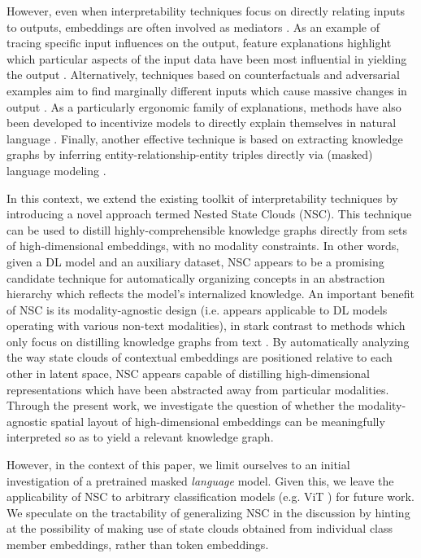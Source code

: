 However, even when interpretability techniques focus on directly relating inputs to outputs, embeddings are often involved as mediators \citep{danilevsky_survey_nodate}. As an example of tracing specific input influences on the output, feature explanations highlight which particular aspects of the input data have been most influential in yielding the output \citep{jain_attention_nodate}. Alternatively, techniques based on counterfactuals and adversarial examples aim to find marginally different inputs which cause massive changes in output \citep{madsen_post-hoc_2021}. As a particularly ergonomic family of explanations, methods have also been developed to incentivize models to directly explain themselves in natural language \citep{madsen_post-hoc_2021}. Finally, another effective technique is based on extracting knowledge graphs by inferring entity-relationship-entity triples directly via (masked) language modeling \citep{wang_language_2020}.

In this context, we extend the existing toolkit of interpretability techniques by introducing a novel approach termed Nested State Clouds (NSC). This technique can be used to distill highly-comprehensible knowledge graphs directly from sets of high-dimensional embeddings, with no modality constraints. In other words, given a DL model and an auxiliary dataset, NSC appears to be a promising candidate technique for automatically organizing concepts in an abstraction hierarchy which reflects the model's internalized knowledge. An important benefit of NSC is its modality-agnostic design (i.e. appears applicable to DL models operating with various non-text modalities), in stark contrast to methods which only focus on distilling knowledge graphs from text \citep{wang_language_2020}. By automatically analyzing the way state clouds of contextual embeddings are positioned relative to each other in latent space, NSC appears capable of distilling high-dimensional representations which have been abstracted away from particular modalities. Through the present work, we investigate the question of whether the modality-agnostic spatial layout of high-dimensional embeddings can be meaningfully interpreted so as to yield a relevant knowledge graph.

However, in the context of this paper, we limit ourselves to an initial investigation of a pretrained masked \textit{language} model. Given this, we leave the applicability of NSC to arbitrary classification models (e.g. ViT \citep{dosovitskiy_image_2021}) for future work. We speculate on the tractability of generalizing NSC in the discussion by hinting at the possibility of making use of state clouds obtained from individual class member embeddings, rather than token embeddings.

